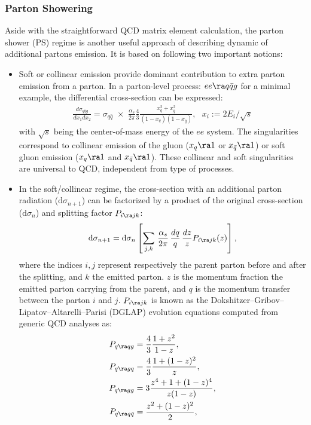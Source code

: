 \subsubsection{Parton Showering}
Aside with the straightforward  QCD matrix element calculation,
the parton shower (PS) regime is another useful approach of describing dynamic of additional partons emission.
It is based on following two important notions:

\begin{itemize}
\item Soft or collinear emission provide dominant contribution to extra parton emission from a parton.
In a parton-level process: $ee \ra q\bar{q} g$ for a minimal example, the differential cross-section can be expressed:
\begin{align}
\frac{d\sigma_{q\bar{q}g}}{dx_1 dx_2} = \sigma_{q\bar{q}} \,\, \times \,\, \frac{\alpha_s}{2\pi} \frac{4}{3} \frac{x_q^2+x_{\bar{q}}^2}{(1-x_q)(1-x_{\bar{q}})}, \,\,\,\, x_i := 2E_i/\sqrt{s}
\end{align}
with $\sqrt{s}$ being the center-of-mass energy of the $ee$ system.
The singularities correspond to collinear emission of the gluon ($x_q \ra 1$ or $x_{\bar{q}} \ra 1$) or soft gluon emission ($x_q \ra 1$ and $x_{\bar{q}} \ra 1$).
These collinear and soft singularities are universal to QCD, independent from type of processes. \\

\item In the soft/collinear regime, the cross-section with an additional parton radiation ($\mathrm{d}\sigma_{n+1}$) can be factorized by a product of the original cross-section ($\mathrm{d}\sigma_{n}$) and splitting factor $P_{i \ra j k}$:
\begin{align}
\mathrm{d}\sigma_{n+1} = \mathrm{d}\sigma_n \left[ \sum_{j,k} \,  \frac{\alpha_s}{2\pi} \, \frac{dq}{q} \, \frac{dz}{z} P_{i \ra j k} (z) \right],
\end{align}
where the indices $i,j$ represent respectively the parent parton before and after the splitting, and $k$ the emitted parton. 
$z$ is the momentum fraction the emitted parton carrying from the parent, and $q$ is the momentum transfer between the parton $i$ and $j$. $P_{i \ra j k}$ is known as the Dokshitzer–Gribov–Lipatov–Altarelli–Parisi (DGLAP) evolution equations \cite{D_DEGLAP}\cite{L_DEGLAP}\cite{AP_DEGLAP} computed from generic QCD analyses as:
\begin{align}
P_{q \ra qg} & = \frac{4}{3} \frac{1+z^2}{1-z}, \\
P_{q \ra gq} & = \frac{4}{3} \frac{1+(1-z)^2}{z}, \\
P_{q \ra gg} & = 3 \frac{z^4+1+(1-z)^4}{z(1-z)}, \\
P_{q \ra q\bar{q}} & = \frac{z^2+(1-z)^2}{2},
\end{align}
\end{itemize}

